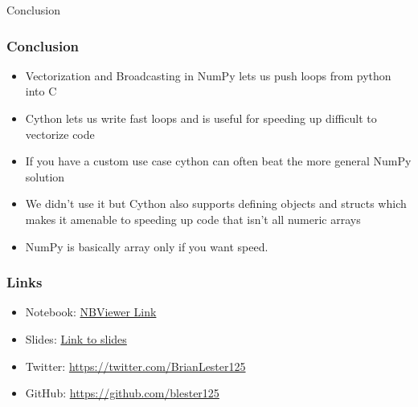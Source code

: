 \documentclass{beamer}
\theoremstyle{case}
\begin{document}
\begin{section}{Conclusion}

\begin{frame}
    \frametitle{Conclusion}
    \begin{itemize}
        \item Vectorization and Broadcasting in NumPy lets us push loops from python into C
        \item Cython lets us write fast loops and is useful for speeding up difficult to vectorize code
        \item If you have a custom use case cython can often beat the more general NumPy solution
    \end{itemize}
    \begin{itemize}
        \item We didn't use it but Cython also supports defining objects and structs which makes it amenable to speeding up code that isn't all numeric arrays
        \item NumPy is basically array only if you want speed.
    \end{itemize}
\end{frame}

\begin{frame}
    \frametitle{Links}
    \begin{itemize}
        \item Notebook: \href{https://www.google.com}{NBViewer Link}
        \item Slides: \href{https://github.com/blester125/MIPy-Talk-Jan-2-2019/blob/master/slides/slides.pdf}{Link to slides}
        \item Twitter: \href{https://twitter.com/BrianLester125}{https://twitter.com/BrianLester125}
        \item GitHub: \href{https://github.com/blester125}{https://github.com/blester125}
    \end{itemize}
\end{frame}

\end{section} %
\end{document}
